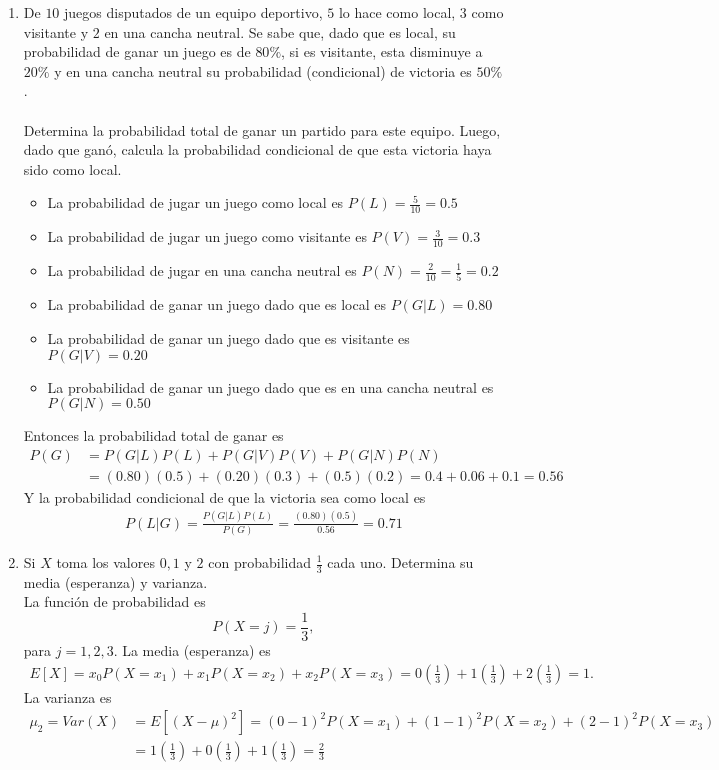 \documentclass{article}
\begin{document}
\begin{enumerate}
\item De $10$ juegos disputados de un equipo deportivo, $5$ lo hace como local, $3$ como visitante y $2$ en una cancha neutral. Se sabe que, dado que es local, su probabilidad de ganar un juego es de $80\%$, si es visitante, esta disminuye a $20\%$ y en una cancha neutral su probabilidad (condicional) de victoria es $50\%$. \\ \\Determina la probabilidad total de ganar un partido para este equipo. Luego, dado que gan\'o, calcula la probabilidad condicional de que esta victoria haya sido como local.
\begin{itemize}
\item La probabilidad de jugar un juego como local es $P(L) = \frac{5}{10} = 0.5$
\item La probabilidad de jugar un juego como visitante es $P(V) = \frac{3}{10} = 0.3$
\item La probabilidad de jugar en una cancha neutral es $P(N) = \frac{2}{10} = \frac{1}{5} = 0.2$
\item La probabilidad de ganar un juego dado que es local es $P(G|L) = 0.80$
\item La probabilidad de ganar un juego dado que es visitante es $P(G|V) = 0.20$
\item La probabilidad de ganar un juego dado que es en una cancha neutral es $P(G|N) = 0.50$
\end{itemize}
Entonces la probabilidad total de ganar es
\begin{align*}
P(G) &= P(G|L)P(L) + P(G|V)P(V) + P(G|N)P(N) \\
&=  (0.80)(0.5) + (0.20)(0.3) + (0.5)(0.2) = 0.4 + 0.06 +0.1 = 0.56
\end{align*}
Y la probabilidad condicional de que la victoria sea como local es
\begin{align*}
P(L|G) = \frac{P(G|L)P(L)}{P(G)} = \frac{(0.80)(0.5)}{0.56}= 0.71
\end{align*}

\item Si $X$ toma los valores $0,1$ y $2$ con probabilidad $\frac{1}{3}$ cada uno. Determina su media (esperanza) y varianza.
\\ La funci\'on de probabilidad es 
\begin{equation*}
P(X = j) = \frac{1}{3},
\end{equation*}
para $j = 1, 2, 3$. La media (esperanza) es
\begin{align*}
E[X] = x_0P(X = x_1) + x_1P(X = x_2) + x_2P(X = x_3) = 0\left( \frac{1}{3}\right) + 1\left(\frac{1}{3}\right) + 2\left(\frac{1}{3}\right) = 1.
\end{align*}
La varianza es
\begin{align*}
\mu_2 = Var(X) &= E[(X - \mu )^2] = (0 - 1)^2 P(X = x_1) + (1 - 1)^2P(X = x_2) + (2 - 1)^2P(X = x_3)  \\
& = 1\left( \frac{1}{3}\right) + 0 \left(\frac{1}{3}\right) + 1\left(\frac{1}{3}\right) = \frac{2}{3}
\end{align*}


\end{enumerate}
\end{document}
